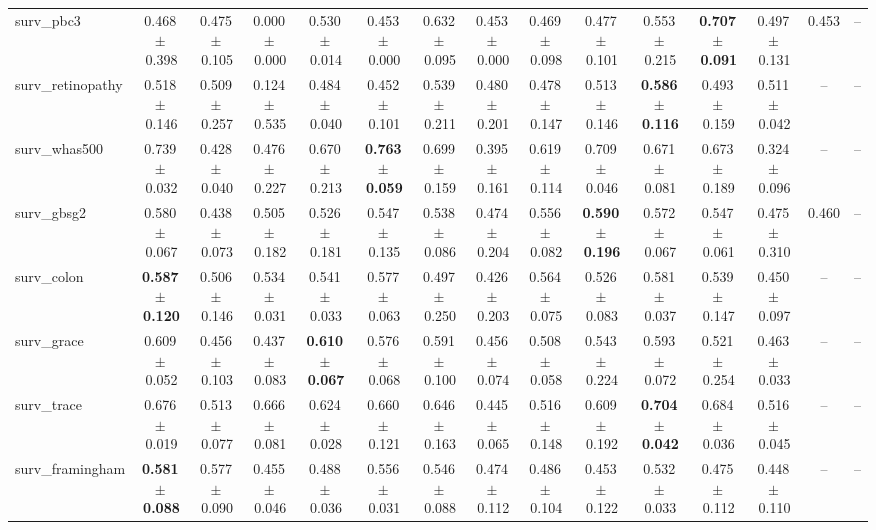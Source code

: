 \documentclass[8pt]{extarticle}
\begin{document}
\begin{longtable}{l*{14}{c}}
surv\_pbc3 & 0.468\,$\pm$\,0.398 & 0.475\,$\pm$\,0.105 & 0.000\,$\pm$\,0.000 & 0.530\,$\pm$\,0.014 & 0.453\,$\pm$\,0.000 & 0.632\,$\pm$\,0.095 & 0.453\,$\pm$\,0.000 & 0.469\,$\pm$\,0.098 & 0.477\,$\pm$\,0.101 & 0.553\,$\pm$\,0.215 & \textbf{0.707\,$\pm$\,0.091} & 0.497\,$\pm$\,0.131 & 0.453 & -- \\
surv\_retinopathy & 0.518\,$\pm$\,0.146 & 0.509\,$\pm$\,0.257 & 0.124\,$\pm$\,0.535 & 0.484\,$\pm$\,0.040 & 0.452\,$\pm$\,0.101 & 0.539\,$\pm$\,0.211 & 0.480\,$\pm$\,0.201 & 0.478\,$\pm$\,0.147 & 0.513\,$\pm$\,0.146 & \textbf{0.586\,$\pm$\,0.116} & 0.493\,$\pm$\,0.159 & 0.511\,$\pm$\,0.042 & -- & -- \\
surv\_whas500 & 0.739\,$\pm$\,0.032 & 0.428\,$\pm$\,0.040 & 0.476\,$\pm$\,0.227 & 0.670\,$\pm$\,0.213 & \textbf{0.763\,$\pm$\,0.059} & 0.699\,$\pm$\,0.159 & 0.395\,$\pm$\,0.161 & 0.619\,$\pm$\,0.114 & 0.709\,$\pm$\,0.046 & 0.671\,$\pm$\,0.081 & 0.673\,$\pm$\,0.189 & 0.324\,$\pm$\,0.096 & -- & -- \\
surv\_gbsg2 & 0.580\,$\pm$\,0.067 & 0.438\,$\pm$\,0.073 & 0.505\,$\pm$\,0.182 & 0.526\,$\pm$\,0.181 & 0.547\,$\pm$\,0.135 & 0.538\,$\pm$\,0.086 & 0.474\,$\pm$\,0.204 & 0.556\,$\pm$\,0.082 & \textbf{0.590\,$\pm$\,0.196} & 0.572\,$\pm$\,0.067 & 0.547\,$\pm$\,0.061 & 0.475\,$\pm$\,0.310 & 0.460 & -- \\
surv\_colon & \textbf{0.587\,$\pm$\,0.120} & 0.506\,$\pm$\,0.146 & 0.534\,$\pm$\,0.031 & 0.541\,$\pm$\,0.033 & 0.577\,$\pm$\,0.063 & 0.497\,$\pm$\,0.250 & 0.426\,$\pm$\,0.203 & 0.564\,$\pm$\,0.075 & 0.526\,$\pm$\,0.083 & 0.581\,$\pm$\,0.037 & 0.539\,$\pm$\,0.147 & 0.450\,$\pm$\,0.097 & -- & -- \\
surv\_grace & 0.609\,$\pm$\,0.052 & 0.456\,$\pm$\,0.103 & 0.437\,$\pm$\,0.083 & \textbf{0.610\,$\pm$\,0.067} & 0.576\,$\pm$\,0.068 & 0.591\,$\pm$\,0.100 & 0.456\,$\pm$\,0.074 & 0.508\,$\pm$\,0.058 & 0.543\,$\pm$\,0.224 & 0.593\,$\pm$\,0.072 & 0.521\,$\pm$\,0.254 & 0.463\,$\pm$\,0.033 & -- & -- \\
surv\_trace & 0.676\,$\pm$\,0.019 & 0.513\,$\pm$\,0.077 & 0.666\,$\pm$\,0.081 & 0.624\,$\pm$\,0.028 & 0.660\,$\pm$\,0.121 & 0.646\,$\pm$\,0.163 & 0.445\,$\pm$\,0.065 & 0.516\,$\pm$\,0.148 & 0.609\,$\pm$\,0.192 & \textbf{0.704\,$\pm$\,0.042} & 0.684\,$\pm$\,0.036 & 0.516\,$\pm$\,0.045 & -- & -- \\
surv\_framingham & \textbf{0.581\,$\pm$\,0.088} & 0.577\,$\pm$\,0.090 & 0.455\,$\pm$\,0.046 & 0.488\,$\pm$\,0.036 & 0.556\,$\pm$\,0.031 & 0.546\,$\pm$\,0.088 & 0.474\,$\pm$\,0.112 & 0.486\,$\pm$\,0.104 & 0.453\,$\pm$\,0.122 & 0.532\,$\pm$\,0.033 & 0.475\,$\pm$\,0.112 & 0.448\,$\pm$\,0.110 & -- & -- \\

\end{longtable}
\end{document}
